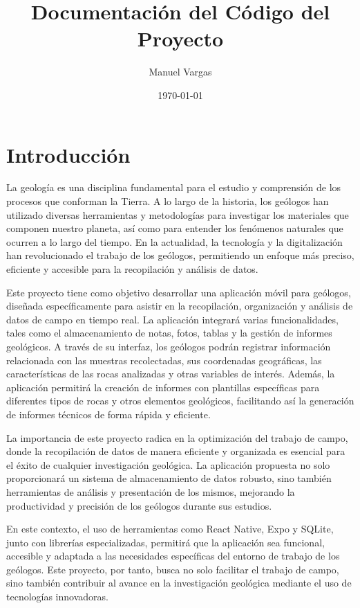 \documentclass[a4paper,12pt]{article}
\title{Documentación del Código del Proyecto}
\author{Manuel Vargas}
\date{\today}
\begin{document}
\maketitle

\tableofcontents

\section{Introducción}
La geología es una disciplina fundamental para el estudio y comprensión de los procesos que conforman la Tierra. A lo largo de la historia, los geólogos han utilizado diversas herramientas y metodologías para investigar los materiales que componen nuestro planeta, así como para entender los fenómenos naturales que ocurren a lo largo del tiempo. En la actualidad, la tecnología y la digitalización han revolucionado el trabajo de los geólogos, permitiendo un enfoque más preciso, eficiente y accesible para la recopilación y análisis de datos.

Este proyecto tiene como objetivo desarrollar una aplicación móvil para geólogos, diseñada específicamente para asistir en la recopilación, organización y análisis de datos de campo en tiempo real. La aplicación integrará varias funcionalidades, tales como el almacenamiento de notas, fotos, tablas y la gestión de informes geológicos. A través de su interfaz, los geólogos podrán registrar información relacionada con las muestras recolectadas, sus coordenadas geográficas, las características de las rocas analizadas y otras variables de interés. Además, la aplicación permitirá la creación de informes con plantillas específicas para diferentes tipos de rocas y otros elementos geológicos, facilitando así la generación de informes técnicos de forma rápida y eficiente.

La importancia de este proyecto radica en la optimización del trabajo de campo, donde la recopilación de datos de manera eficiente y organizada es esencial para el éxito de cualquier investigación geológica. La aplicación propuesta no solo proporcionará un sistema de almacenamiento de datos robusto, sino también herramientas de análisis y presentación de los mismos, mejorando la productividad y precisión de los geólogos durante sus estudios.

En este contexto, el uso de herramientas como React Native, Expo y SQLite, junto con librerías especializadas, permitirá que la aplicación sea funcional, accesible y adaptada a las necesidades específicas del entorno de trabajo de los geólogos. Este proyecto, por tanto, busca no solo facilitar el trabajo de campo, sino también contribuir al avance en la investigación geológica mediante el uso de tecnologías innovadoras.
\end{document}
